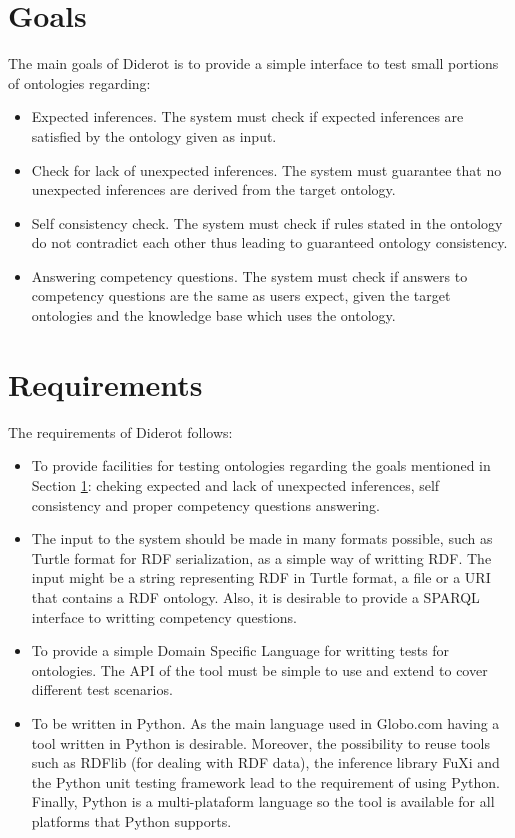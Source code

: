 \documentclass{report}
\begin{document}
\section{Goals}
\label{goals}

The main goals of Diderot is to provide a simple interface to test small portions of ontologies regarding:

\begin{itemize}
    \item Expected inferences. The system must check if expected inferences are satisfied by the ontology
        given as input.
    \item Check for lack of unexpected inferences. The system must guarantee that no unexpected inferences are
        derived from the target ontology.
    \item Self consistency check. The system must check if rules stated in the ontology do not
        contradict each other thus leading to guaranteed ontology consistency.
    \item Answering competency questions. The system must check if answers to competency questions are
        the same as users expect, given the target ontologies and the knowledge base which uses the ontology.
\end{itemize}

\section{Requirements}
\label{requirements}

The requirements of Diderot follows:
\begin{itemize}
    \item To provide facilities for testing ontologies regarding the goals mentioned in Section \ref{goals}: cheking
        expected and lack of unexpected inferences, self consistency and proper competency questions answering.
    \item The input to the system should be made in many formats possible, such as Turtle format for RDF serialization,
        as a simple way of writting RDF. The input might be a string representing RDF in Turtle format, a file or a
        URI that contains a RDF ontology. Also, it is desirable to provide a SPARQL interface to writting competency questions.
    \item To provide a simple Domain Specific Language for writting tests for ontologies. The API of the tool must be simple
        to use and extend to cover different test scenarios.
    \item To be written in Python. As the main language used in Globo.com having a tool written in Python is desirable.
        Moreover, the possibility to reuse tools such as RDFlib (for dealing with RDF data), the inference library FuXi
        and the Python unit testing framework lead to the requirement of using Python.
        Finally, Python is a multi-plataform language so the tool is available for all platforms that Python supports.
\end{itemize}
\end{document}
